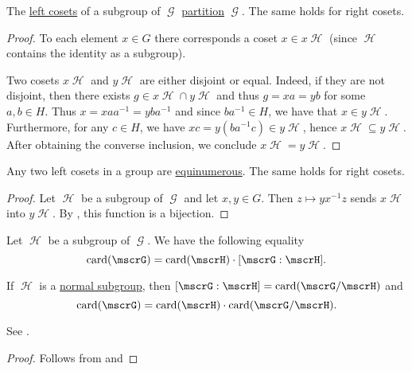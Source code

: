 \begin{lemma}\label{thm:group_coset_partition}
  The \hyperref[def:group_cosets]{left cosets} of a subgroup of \( \mscrG \) \hyperref[def:set_partition]{partition} \( \mscrG \). The same holds for right cosets.
\end{lemma}
\begin{proof}
  To each element \( x \in G \) there corresponds a coset \( x \in x\mscrH \) (since \( \mscrH \) contains the identity as a subgroup).

  Two cosets \( x\mscrH \) and \( y\mscrH \) are either disjoint or equal. Indeed, if they are not disjoint, then there exists \( g \in x\mscrH \cap y\mscrH \) and thus \( g = xa = yb \) for some \( a, b \in H \). Thus \( x = x a a^{-1} = y b a^{-1} \) and since \( b a^{-1} \in H \), we have that \( x \in y\mscrH \). Furthermore, for any \( c \in H \), we have \( xc = y(b a^{-1} c) \in y\mscrH \), hence \( x\mscrH \subseteq y\mscrH \). After obtaining the converse inclusion, we conclude \( x\mscrH = y\mscrH \).
\end{proof}

\begin{lemma}\label{thm:group_coset_bijection}
  Any two left cosets in a group are \hyperref[def:equinumerous_sets]{equinumerous}. The same holds for right cosets.
\end{lemma}
\begin{proof}
  Let \( \mscrH \) be a subgroup of \( \mscrG \) and let \( x, y \in G \). Then \( z \mapsto y x^{-1} z \) sends \( x\mscrH \) into \( y\mscrH \). By , this function is a bijection.
\end{proof}

\begin{theorem}\label{thm:lagranges_theorem_for_groups}
  Let \( \mscrH \) be a subgroup of \( \mscrG \). We have the following equality
  \begin{equation}\label{eq:thm:lagranges_theorem_for_groups/index}
    \card(\mscrG) = \card(\mscrH) \cdot [\mscrG : \mscrH].
  \end{equation}

  If \( \mscrH \) is a \hyperref[def:normal_subgroup]{normal subgroup}, then \( [\mscrG : \mscrH] = \card(\mscrG / \mscrH) \) and
  \begin{equation}\label{eq:thm:lagranges_theorem_for_groups/card}
    \card(\mscrG) = \card(\mscrH) \cdot \card(\mscrG / \mscrH).
  \end{equation}

  See .
\end{theorem}
\begin{proof}
  Follows from  and 
\end{proof}

